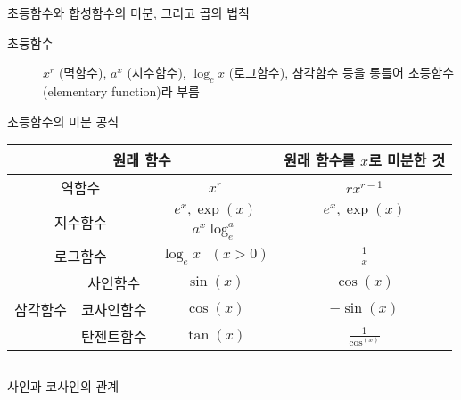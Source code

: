 \documentclass[10pt,t]{beamer}
\begin{document}
\begin{frame}{초등함수와 합성함수의 미분, 그리고 곱의 법칙}

    \begin{description}
        \item[초등함수] $x^r$ (멱함수), $a^x$ (지수함수), $\log_c x$ (로그함수), 삼각함수 등을 통틀어 초등함수(elementary function)라 부름
    \end{description}

    초등함수의 미분 공식 \vspace{-2em}
    \begin{table}
    \begin{tabular}{|c | c| c | c|}\hline
        \multicolumn{3}{|c|}{원래 함수} & 원래 함수를 $x$로 미분한 것 \\ \hline
        \multicolumn{2}{|c|}{역함수} & $x^r$ & $rx^{r-1}$ \\ \hline
        \multicolumn{2}{|c|}{\multirow{2}{*}{지수함수}} & $e^x, \exp(x)$ & $e^x, \exp(x)$ \\ \cline{3-4}
        \multicolumn{2}{|c|}{}& $a^x$ & $a^x\log _e ^a$ \\ \hline
        \multicolumn{2}{|c|}{로그함수} & $\log _e x ~~~(x>0)$ & $\frac{1}{x}$ \\ \hline
        \multirow{3}{*}{삼각함수} &  사인함수 & $\sin (x)$ &  $\cos (x)$ \\ \cline{2-4}
        & 코사인함수 & $\cos (x)$ &  $-\sin (x)$ \\ \cline{2-4}
        & 탄젠트함수 & $\tan (x)$ &  $\frac{1}{\cos^ (x)}$ \\ \hline
        
        
    \end{tabular}
    \end{table}
\pagebreak

\begin{columns}

사인과 코사인의 관계


\end{columns}
\end{frame}
\end{document}
